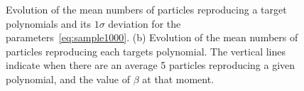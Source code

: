 \documentclass[11pt]{article}
\begin{document}
\begin{enumerate}
	  \begin{figure}[h!]
	  	\centering
	  	\caption{Evolution of the mean numbers of particles reproducing a target polynomials and its $1\sigma$ deviation for the parameters~\eqref{eq:sample1000}. (b) Evolution of the mean numbers of particles reproducing each targets polynomial. The vertical lines indicate when there are an average 5 particles reproducing a given polynomial, and the value of $\beta$ at that moment.}
	  	\label{fig:sample1000}
	  \end{figure}
  \end{enumerate}
	
\end{document}
